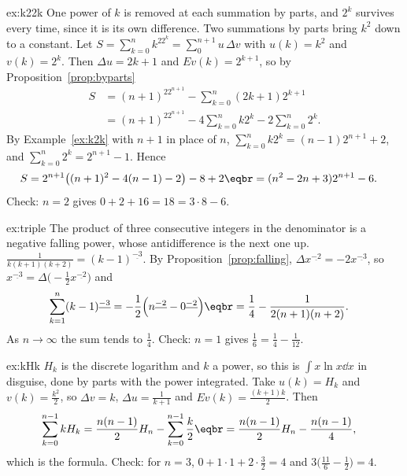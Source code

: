 \begin{solution}{ex:k22k}
\idea One power of $k$ is removed at each summation by parts, and $2^k$ survives every time, since it is its own
difference. Two summations by parts bring $k^2$ down to a constant.
\writeup Let $S=\sum_{k=0}^nk^22^k=\sum_0^{n+1}u\,\Delta v$ with $u(k)=k^2$ and $v(k)=2^k$. Then $\Delta u=2k+1$ and
$Ev(k)=2^{k+1}$, so by Proposition~\ref{prop:byparts}
\[
\begin{aligned}S&=(n+1)^22^{n+1}-\sum_{k=0}^n(2k+1)2^{k+1}\\&=(n+1)^22^{n+1}-4\sum_{k=0}^nk2^k-2\sum_{k=0}^n2^k.\end{aligned}
\]
By Example~\ref{ex:k2k} with $n+1$ in place of $n$, $\sum_{k=0}^nk2^k=(n-1)2^{n+1}+2$, and $\sum_{k=0}^n2^k=2^{n+1}-1$.
Hence
\[
\begin{aligned}S&=2^{n+1}\bigl((n+1)^2-4(n-1)-2\bigr)-8+2\eqbr=(n^2-2n+3)2^{n+1}-6.\end{aligned}
\]
Check: $n=2$ gives $0+2+16=18=3\cdot8-6$.
\end{solution}

\begin{solution}{ex:triple}
\idea The product of three consecutive integers in the denominator is a negative falling power, whose antidifference is
the next one up.
\writeup $\frac1{k(k+1)(k+2)}=(k-1)^{\underline{-3}}$. By Proposition~\ref{prop:falling}, $\Delta x^{\underline{-2}}=-2x^{\underline{-3}}$, so
$x^{\underline{-3}}=\Delta\bigl(-\frac12x^{\underline{-2}}\bigr)$ and
\[
\begin{aligned}\sum_{k=1}^n(k-1)^{\underline{-3}}&=-\frac12\Bigl(n^{\underline{-2}}-0^{\underline{-2}}\Bigr)\eqbr=\frac14-\frac1{2(n+1)(n+2)}.\end{aligned}
\]
As $n\to\infty$ the sum tends to $\frac14$. Check: $n=1$ gives $\frac16=\frac14-\frac1{12}$.
\end{solution}

\begin{solution}{ex:kHk}
\idea $H_k$ is the discrete logarithm and $k$ a power, so this is $\int x\ln x\dd x$ in disguise, done by parts with the
power integrated.
\writeup Take $u(k)=H_k$ and $v(k)=\frac{k^{\underline2}}2$, so $\Delta v=k$, $\Delta u=\frac1{k+1}$ and $Ev(k)=\frac{(k+1)k}2$. Then
\[
\begin{aligned}\sum_{k=0}^{n-1}kH_k&=\frac{n(n-1)}2H_n-\sum_{k=0}^{n-1}\frac k2\eqbr=\frac{n(n-1)}2H_n-\frac{n(n-1)}4,\end{aligned}
\]
which is the formula. Check: for $n=3$, $0+1\cdot1+2\cdot\frac32=4$ and $3\bigl(\frac{11}6-\frac12\bigr)=4$.
\end{solution}

